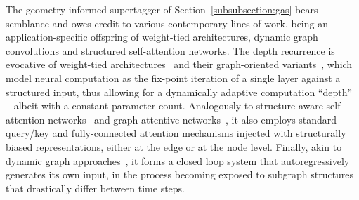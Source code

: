 The geometry-informed supertagger of Section~\ref{subsubsection:gas}	 bears semblance and owes credit to various contemporary lines of work, being an application-specific offspring of weight-tied architectures, dynamic graph convolutions and structured self-attention networks.
The depth recurrence is evocative of weight-tied architectures~\cite{dehghani2018universal,bai2019deep} and their graph-oriented variants~\cite{li2016gated}, which model neural computation as the fix-point iteration of a single layer against a structured input, thus allowing for a dynamically adaptive computation ``depth'' -- albeit with a constant parameter count.
Analogously to structure-aware self-attention networks~\cite{zhu-etal-2019-modeling,cai2020graph} and graph attentive networks~\cite{velivckovic2018graph,yun2019graph,ying2021transformers,brody2021attentive}, it also employs standard query/key and fully-connected attention mechanisms injected with structurally biased representations, either at the edge or at the node level.
Finally, akin to dynamic graph approaches~\cite{liao2019efficient,pareja2020evolvegcn}, it forms a closed loop system that autoregressively generates its own input, in the process becoming exposed to subgraph structures that drastically differ between time steps.



